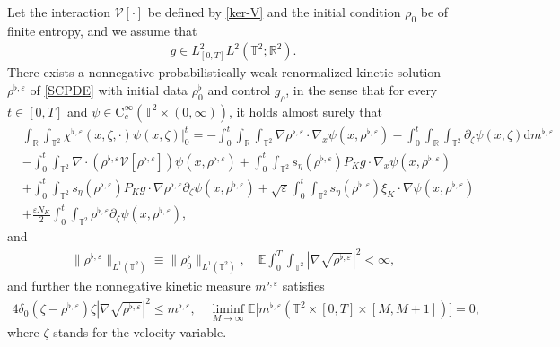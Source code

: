 \begin{prop}\label{cspde WPE}
Let the interaction $\mathcal{V}[\cdot]$ be defined by \eqref{ker-V} and the initial condition $\rho_0$  be of finite entropy, and we assume that
\begin{align*}
g \in L^2_{[0,T]}L^2(\mathbb{T}^2;\mathbb{R}^2). 
\end{align*}
There exists a nonnegative probabilistically weak renormalized kinetic solution $\rho^{\flat,\varepsilon}$ of \eqref{SCPDE} with initial data $\rho^{\flat}_0$ and control $g_{\rho}$, in the sense that for every $t\in[0,T]$ and $\psi \in \mathrm{C}_{c}^{\infty}\left(\mathbb{T}^2\times(0,\infty)\right)$, it holds almost surely that 
%
\begin{align}\label{MC kenitic solution}
&\int_{\mathbb{R}}\int_{\mathbb{T}^2} \chi^{\flat,\varepsilon}(x, \zeta, \cdot) \psi(x, \zeta)\Big|_0^t = -\int_{0}^{t} \int_{\mathbb{R}} \int_{\mathbb{T}^2}\nabla\rho^{\flat,\varepsilon}\cdot\nabla_x\psi(x,\rho^{\flat,\varepsilon}) -\int_{0}^{t} \int_{\mathbb{R}} \int_{\mathbb{T}^2} \partial_{\zeta} \psi(x, \zeta) \mathrm{d}m^{\flat,\varepsilon}\nonumber\\
& - \int_{0}^{t} \int_{\mathbb{T}^2} \nabla\cdot (\rho^{\flat,\varepsilon} \mathcal{V}[\rho^{\flat,\varepsilon}])\psi(x, \rho^{\flat,\varepsilon})
+ \int_{0}^{t} \int_{\mathbb{T}^2} s_{\eta}(\rho^{\flat,\varepsilon})P_{K}g \cdot \nabla_x\psi(x, \rho^{\flat,\varepsilon})\nonumber\\
& + \int_{0}^{t} \int_{\mathbb{T}^2} s_{\eta}(\rho^{\flat,\varepsilon})P_{K}g \cdot \nabla\rho^{\flat,\varepsilon} \partial_\zeta\psi(x, \rho^{\flat,\varepsilon})+\sqrt{\varepsilon}\int_{0}^{t} \int_{\mathbb{T}^2} s_{\eta}(\rho^{\flat,\varepsilon}) \xi_{K}\cdot \nabla \psi(x, \rho^{\flat,\varepsilon})\nonumber\\
&+\frac{\varepsilon N_K}{2}\int_{0}^{t} \int_{\mathbb{T}^2} \rho^{\flat,\varepsilon} \partial_{\zeta} \psi(x, \rho^{\flat,\varepsilon}),
\end{align}
%
and
%
\begin{align}\label{L1-rho-flat}
\|\rho^{\flat,\varepsilon}\|_{L^{1}\left(\mathbb{T}^2\right)}\equiv \|\rho^{\flat}_0\|_{L^{1}(\mathbb{T}^2)}, \quad \mathbb{E}\int_0^T\int_{\mathbb{T}^2} |\nabla \sqrt{\rho^{\flat,\varepsilon}}|^2 < \infty,
\end{align}
and further the nonnegative kinetic measure $m^{\flat,\varepsilon}$ satisfies
% 
\begin{align}\label{rho-flat-kinetic-measure}
4\delta_{0}(\zeta-\rho^{\flat,\varepsilon})\zeta |\nabla \sqrt{\rho^{\flat,\varepsilon}}|^{2}\le m^{\flat,\varepsilon},\quad \liminf_{M\to \infty} \mathbb{E}\big[m^{\flat,\varepsilon}(\mathbb{T}^2\times [0,T]\times [M,M+1])\big]=0,
\end{align}
%
where $\zeta$ stands for the velocity variable.
\end{prop}

